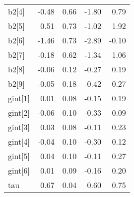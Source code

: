 \documentclass[12pt,]{article}
\begin{document}
\begin{table}[ht]
{\begin{tabular}{lrrrr}
  b2[4] & -0.48 & 0.66 & -1.80 & 0.79 \\ 
  b2[5] & 0.51 & 0.73 & -1.02 & 1.92 \\ 
  b2[6] & -1.46 & 0.73 & -2.89 & -0.10 \\ 
  b2[7] & -0.18 & 0.62 & -1.34 & 1.06 \\ 
  b2[8] & -0.06 & 0.12 & -0.27 & 0.19 \\ 
  b2[9] & -0.05 & 0.18 & -0.42 & 0.27 \\ 
  gint[1] & 0.01 & 0.08 & -0.15 & 0.19 \\ 
  gint[2] & -0.06 & 0.10 & -0.33 & 0.09 \\ 
  gint[3] & 0.03 & 0.08 & -0.11 & 0.23 \\ 
  gint[4] & -0.04 & 0.10 & -0.30 & 0.12 \\ 
  gint[5] & 0.04 & 0.10 & -0.11 & 0.27 \\ 
  gint[6] & 0.01 & 0.09 & -0.16 & 0.20 \\ 
  tau & 0.67 & 0.04 & 0.60 & 0.75 \\ 
   \hline
\end{tabular}
}
\end{table}
\end{document}
